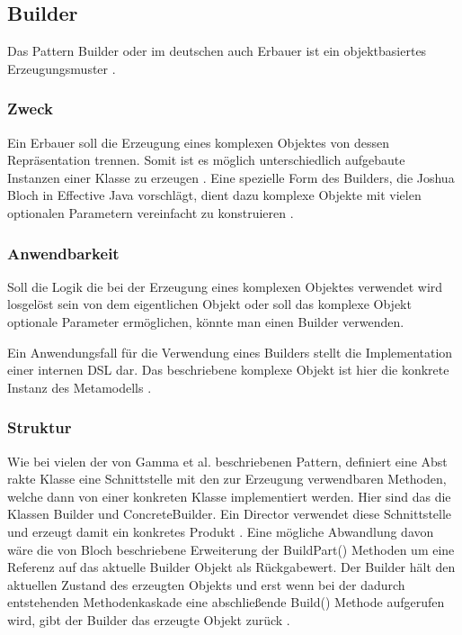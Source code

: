 \documentclass[12pt,oneside,a4paper,parskip]{scrbook}
\begin{document}
\subsection{Builder}

Das Pattern Builder oder im deutschen auch Erbauer ist ein objektbasiertes Erzeugungsmuster \cite[S. 159]{gamma2015}.

\subsubsection{Zweck}

Ein Erbauer soll die Erzeugung eines komplexen Objektes von dessen Repräsentation trennen. Somit ist es möglich unterschiedlich aufgebaute Instanzen einer Klasse zu erzeugen \cite[S. 159]{gamma2015}. Eine spezielle Form des Builders, die Joshua Bloch in Effective Java vorschlägt, dient dazu komplexe Objekte mit vielen optionalen Parametern vereinfacht zu konstruieren \cite[S. 10ff.]{bloch2017}. 

\subsubsection{Anwendbarkeit}

Soll die Logik die bei der Erzeugung eines komplexen Objektes verwendet wird losgelöst sein von dem eigentlichen Objekt oder soll das komplexe Objekt optionale Parameter ermöglichen, könnte man einen Builder verwenden.

Ein Anwendungsfall für die Verwendung eines Builders stellt die Implementation einer internen DSL dar. Das beschriebene komplexe Objekt ist hier die konkrete Instanz des Metamodells \cite[S. 343ff.]{fowler2010}.

\subsubsection{Struktur}

Wie bei vielen der von Gamma et al. beschriebenen Pattern, definiert eine Abst rakte Klasse eine Schnittstelle mit den zur Erzeugung verwendbaren Methoden, welche dann von einer konkreten Klasse implementiert werden. Hier sind das die Klassen Builder und ConcreteBuilder. Ein Director verwendet diese Schnittstelle und erzeugt damit ein konkretes Produkt \cite[S. 162f.]{gamma2015}. Eine mögliche Abwandlung davon wäre die von Bloch beschriebene Erweiterung der BuildPart() Methoden um eine Referenz auf das aktuelle Builder Objekt als Rückgabewert. Der Builder hält den aktuellen Zustand des erzeugten Objekts und erst wenn bei der dadurch entstehenden Methodenkaskade eine abschließende Build() Methode aufgerufen wird, gibt der Builder das erzeugte Objekt zurück \cite[S. 13ff]{bloch2017}.
\end{document}
